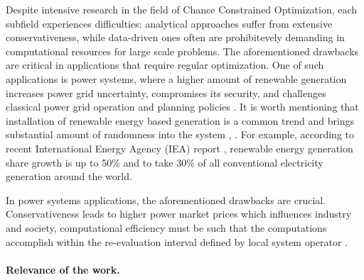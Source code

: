 Despite intensive research in the field of Chance Constrained Optimization, each subfield experiences difficulties: analytical approaches suffer from extensive conservativeness, while data-driven ones often are prohibitevely demanding in computational resources for large scale problems. The aforementioned drawbacks are critical in applications that require regular optimization. 
One of such applications is power systems, where a higher amount of renewable generation increases power grid uncertainty, compromises its security, and challenges classical power grid operation and planning policies \cite{koutsoyiannis2016unavoidable}. It is worth mentioning that installation of renewable energy based generation is a common trend and brings substantial amount of randomness into the system \cite{koutsoyiannis2016unavoidable}, \cite{harjanne2019abandoning}. For example, according to recent International Energy Agency (IEA) report \cite{iea2024electricity}, renewable energy generation share growth is up to 50\% and to take 30\% of all conventional electricity generation around the world. 

In power systems applications, the aforementioned drawbacks are crucial. Conservativeness leads to higher power market prices which influences industry and society, computational efficiency must be such that the computations accomplish within the re-evaluation interval defined by local system operator \cite{chen2008probabilistic, koutsoyiannis2016unavoidable, stott2012optimal}.




\paragraph{Relevance of the work.}


